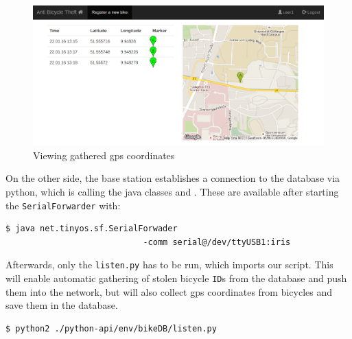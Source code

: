 \documentclass[a4paper]{article}
\begin{document}
\begin{figure}
\begin{center}
\includegraphics[scale=0.3]{pics/view.png}
\end{center}
\caption{Viewing gathered gps coordinates}
\label{fig:gpsdata}
\end{figure}

On the other side, the base station establishes a connection to the database via python, which is calling the java classes \texttt{} and \texttt{}. These are available after starting the \texttt{SerialForwarder} with:
\begin{lstlisting}[frame=single,language=bash]
$ java net.tinyos.sf.SerialForwader
                            -comm serial@/dev/ttyUSB1:iris
\end{lstlisting}
Afterwards, only the \texttt{listen.py} has to be run, which imports our \texttt{} script. This will enable automatic gathering of stolen bicycle \texttt{ID}s from the database and push them into the network, but will also collect gps coordinates from bicycles and save them in the database.
\begin{lstlisting}[frame=single]
$ python2 ./python-api/env/bikeDB/listen.py
\end{lstlisting}
\end{document}
